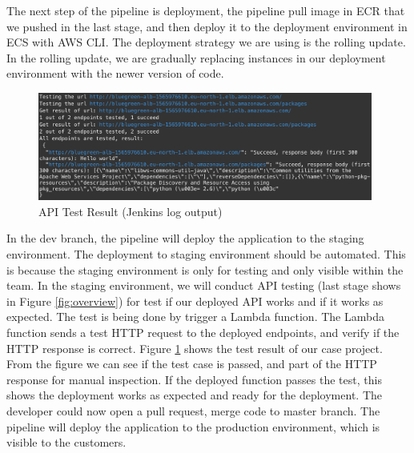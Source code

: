 \par
\label{deploy}
The next step of the pipeline is deployment, the pipeline pull image in ECR that we pushed in the last stage, and then deploy it to the deployment environment in ECS with AWS CLI. The deployment strategy we are using is the rolling update. In the rolling update, we are gradually replacing instances in our deployment environment with the newer version of code.
\begin{figure}[!h]
     \centering
     \includegraphics[width=0.98\textwidth]{pics/test_result.png}
     \caption{API Test Result (Jenkins log output)}
     \label{fig:test-result}
    \end{figure}
\par
In the dev branch, the pipeline will deploy the application to the staging environment. The deployment to staging environment should be automated. This is because the staging environment is only for testing and only visible within the team. 
In the staging environment, we will conduct API testing (last stage shows in Figure \ref{fig:overview}) for test if our deployed API works and if it works as expected. The test is being done by trigger a Lambda function. The Lambda function sends a test HTTP request to the deployed endpoints, and verify if the HTTP response is correct. Figure \ref{fig:test-result} shows the test result of our case project. From the figure we can see if the test case is passed, and part of the HTTP response for manual inspection. If the deployed function passes the test, this shows the deployment works as expected and ready for the deployment. The developer could now open a pull request, merge code to master branch. The pipeline will deploy the application to the production environment, which is visible to the customers.
